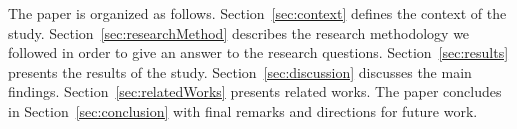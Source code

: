%



The paper is organized as follows. Section~\ref{sec:context} defines the context of the study. Section~\ref{sec:researchMethod} describes the research methodology we followed in order to give an answer to the research questions. Section~\ref{sec:results} presents the results of the study. Section~\ref{sec:discussion} discusses the main findings. Section~\ref{sec:relatedWorks} presents related works. The paper concludes in Section~\ref{sec:conclusion} with final remarks and directions for future work.

